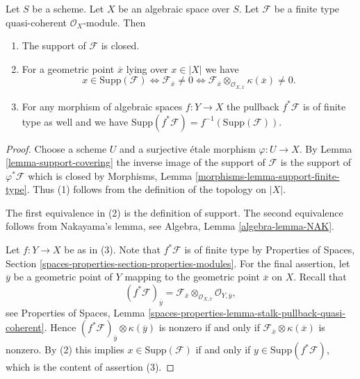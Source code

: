 \begin{lemma}
\label{lemma-support-finite-type}
Let $S$ be a scheme. Let $X$ be an algebraic space over $S$.
Let $\mathcal{F}$ be a finite type quasi-coherent $\mathcal{O}_X$-module.
Then
\begin{enumerate}
\item The support of $\mathcal{F}$ is closed.
\item For a geometric point $\overline{x}$ lying over $x \in |X|$ we have
$$
x \in \text{Supp}(\mathcal{F})
\Leftrightarrow
\mathcal{F}_{\overline{x}} \not = 0
\Leftrightarrow
\mathcal{F}_{\overline{x}} \otimes_{\mathcal{O}_{X, \overline{x}}}
\kappa(\overline{x}) \not = 0.
$$
\item For any morphism of algebraic spaces $f : Y \to X$ the pullback
$f^*\mathcal{F}$ is of finite type as well and we have
$\text{Supp}(f^*\mathcal{F}) = f^{-1}(\text{Supp}(\mathcal{F}))$.
\end{enumerate}
\end{lemma}

\begin{proof}
Choose a scheme $U$ and a surjective \'etale morphism $\varphi : U \to X$.
By Lemma \ref{lemma-support-covering} the inverse image of the support of
$\mathcal{F}$ is the support of $\varphi^*\mathcal{F}$ which is closed by
Morphisms, Lemma \ref{morphisms-lemma-support-finite-type}.
Thus (1) follows from the definition of the topology on $|X|$.

\medskip\noindent
The first equivalence in (2) is the definition of support.
The second equivalence follows from Nakayama's lemma, see
Algebra, Lemma \ref{algebra-lemma-NAK}.

\medskip\noindent
Let $f : Y \to X$ be as in (3). Note that $f^*\mathcal{F}$ is of finite type
by Properties of Spaces, Section
\ref{spaces-properties-section-properties-modules}.
For the final assertion, let $\overline{y}$ be a geometric point of $Y$
mapping to the geometric point $\overline{x}$ on $X$. Recall that
$$
(f^*\mathcal{F})_{\overline{y}} =
\mathcal{F}_{\overline{x}} \otimes_{\mathcal{O}_{X, \overline{x}}}
\mathcal{O}_{Y, \overline{y}},
$$
see Properties of Spaces, Lemma
\ref{spaces-properties-lemma-stalk-pullback-quasi-coherent}.
Hence $(f^*\mathcal{F})_{\overline{y}} \otimes \kappa(\overline{y})$
is nonzero if and only if
$\mathcal{F}_{\overline{x}} \otimes \kappa(\overline{x})$ is nonzero.
By (2) this implies $x \in \text{Supp}(\mathcal{F})$ if and only
if $y \in \text{Supp}(f^*\mathcal{F})$, which is the content of
assertion (3).
\end{proof}

